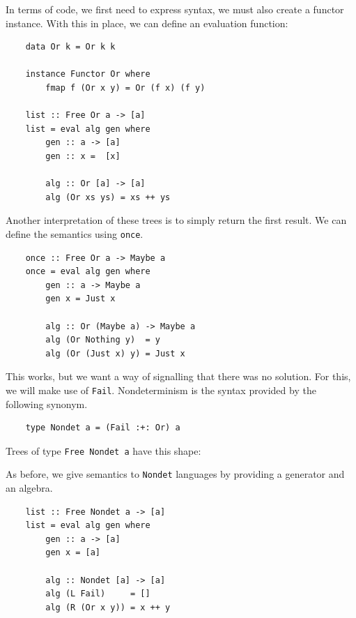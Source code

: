 \documentclass[a4paper,12pt]{article}
\theoremstyle{remark}
\begin{document}
In terms of code, we first need to express syntax, we must also create a functor instance.
With this in place, we can define an evaluation function:

\begin{lstlisting}
    data Or k = Or k k

    instance Functor Or where
        fmap f (Or x y) = Or (f x) (f y)

    list :: Free Or a -> [a]
    list = eval alg gen where
        gen :: a -> [a]
        gen :: x =  [x]

        alg :: Or [a] -> [a]
        alg (Or xs ys) = xs ++ ys  \end{lstlisting}

Another interpretation of these trees is to simply return the first result. We can define the semantics
using \lstinline{once}.

\begin{lstlisting}
    once :: Free Or a -> Maybe a
    once = eval alg gen where
        gen :: a -> Maybe a
        gen x = Just x

        alg :: Or (Maybe a) -> Maybe a
        alg (Or Nothing y)  = y
        alg (Or (Just x) y) = Just x  \end{lstlisting}

This works, but we want a way of signalling that there was no solution. For this, we
will make use of \lstinline{Fail}. Nondeterminism is the syntax provided by the following
synonym.

\begin{lstlisting}
    type Nondet a = (Fail :+: Or) a  \end{lstlisting}

Trees of type \lstinline{Free Nondet a} have this shape:

\begin{figure}[H]
  \centering
\end{figure}

As before, we give semantics to \lstinline{Nondet} languages by providing a generator
and an algebra.

\begin{lstlisting}
    list :: Free Nondet a -> [a]
    list = eval alg gen where
        gen :: a -> [a]
        gen x = [a]

        alg :: Nondet [a] -> [a]
        alg (L Fail)     = []
        alg (R (Or x y)) = x ++ y  \end{lstlisting}
\end{document}
